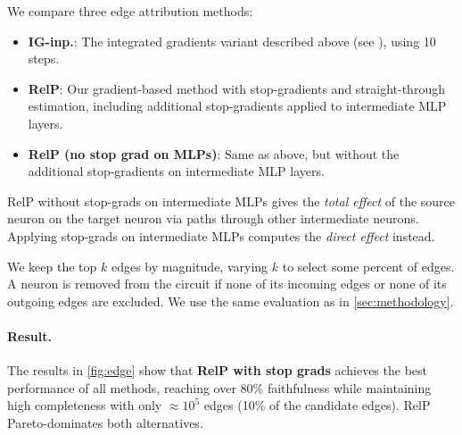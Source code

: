 \documentclass{article}
\theoremstyle{plain}
\theoremstyle{definition}
\theoremstyle{remark}
\begin{document}
We compare three edge attribution methods:
\begin{itemize}
\item \textbf{IG-inp.}: The integrated gradients variant described above (see \citealp{hanna2024faith}), using 10 steps.
\item \textbf{RelP}: Our gradient-based method with stop-gradients and straight-through estimation, including additional stop-gradients applied to intermediate MLP layers. 
\item \textbf{RelP (no stop grad on MLPs)}: Same as above, but without the additional stop-gradients on intermediate MLP layers.
\end{itemize}
RelP without stop-grads on intermediate MLPs gives the \textit{total effect} of the source neuron on the target neuron via paths through other intermediate neurons. Applying stop-grads on intermediate MLPs computes the \textit{direct effect} instead.

We keep the top $k$ edges by magnitude, varying $k$ to select some percent of edges.
A neuron is removed from the circuit if none of its incoming edges or none of its outgoing edges are excluded. We use the same evaluation as in \cref{sec:methodology}.

\paragraph{Result.} The results in \cref{fig:edge} show that \textbf{RelP with stop grads} achieves the best performance of all methods, reaching over 80\% faithfulness while maintaining high completeness with only $\approx{}10^5$ edges (10\% of the candidate edges). RelP Pareto-dominates both alternatives.
\end{document}
